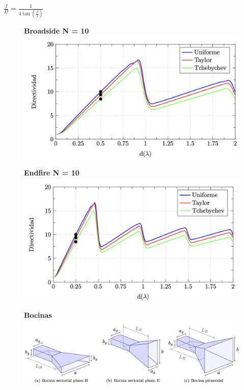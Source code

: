 \documentclass[twocolumn, 8pt]{extarticle}
\begin{document}
\vspace{0.5cm}
\( \frac{f}{D} = \frac{1}{4\tan\left(\frac{\beta}{2}\right)} \)

\newpage

\begin{multicols}{2}
	\begin{figure}[H]
		\centering
		\textbf{Broadside N = 10}
		\includegraphics[width=\columnwidth]{directividad_broadside.png}
	\end{figure}

	\begin{figure}[H]
		\centering
		\textbf{Endfire N = 10}
		\includegraphics[width=\columnwidth]{directividad_endfire.png}
	\end{figure}
\end{multicols}

\begin{figure}[H]
	\centering
	\textbf{Bocinas}
	\centering
	\includegraphics[width=\columnwidth]{bocinas.png}
\end{figure}
\end{document}
